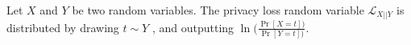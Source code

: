 
\begin{definition}
    Let $X$ and $Y$ be two random variables. The privacy loss random variable  $\mathcal{L}_{X||Y}$ is distributed by drawing $t \sim Y$ , and outputting $\ln ( \frac {\Pr \left[ X=t\right] )}{\Pr \left[ Y=t\right] )} $.
\end{definition}

